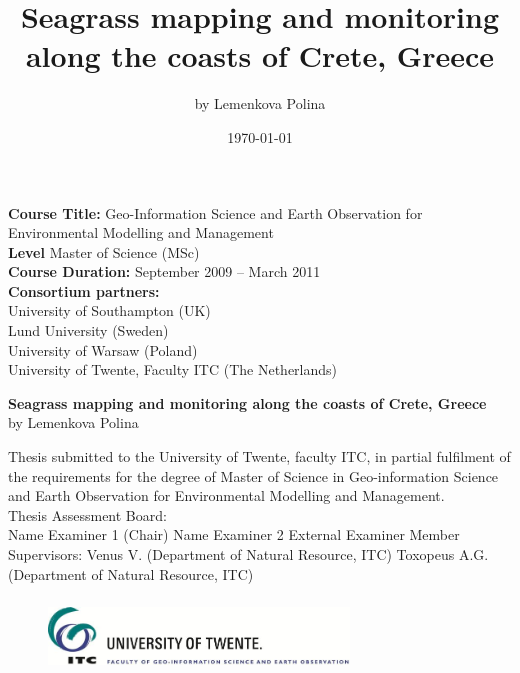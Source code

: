 \documentclass[10pt, a4paper]{article}
\begin{document}

\title{Seagrass mapping and monitoring along the coasts of Crete, Greece}
\author{by Lemenkova Polina}
\date{\today}
\maketitle
\pagebreak

\textbf{Course Title:} \hfill{Geo-Information Science and Earth Observation for Environmental Modelling and Management}\\


\textbf{Level} \hfill{Master of Science (MSc)}\\
\textbf{Course Duration:} \hfill{September 2009 – March 2011}\\
\textbf{Consortium partners:} \\


University of Southampton (UK)\\
Lund University (Sweden)\\
University of Warsaw (Poland)\\
University of Twente, Faculty ITC (The Netherlands)

\pagebreak

\begin{center}
\textbf{Seagrass mapping and monitoring along the coasts of Crete, Greece}\\
 {by Lemenkova Polina}
\end{center}

Thesis submitted to the University of Twente, faculty ITC, in partial fulfilment of the requirements
for the degree of Master of Science in Geo-information Science and Earth Observation for
Environmental Modelling and Management.\\

Thesis Assessment Board:\\

Name Examiner 1 (Chair)
Name Examiner 2
External Examiner
Member
Supervisors: Venus V. (Department of Natural Resource, ITC)
Toxopeus A.G. (Department of Natural Resource, ITC)\\

\begin{figure}[b]
	\begin{center}
	\includegraphics[height=2cm,width=8cm]{ITC-logo.jpg}
	\end{center}
\end{figure}
\end{document}
